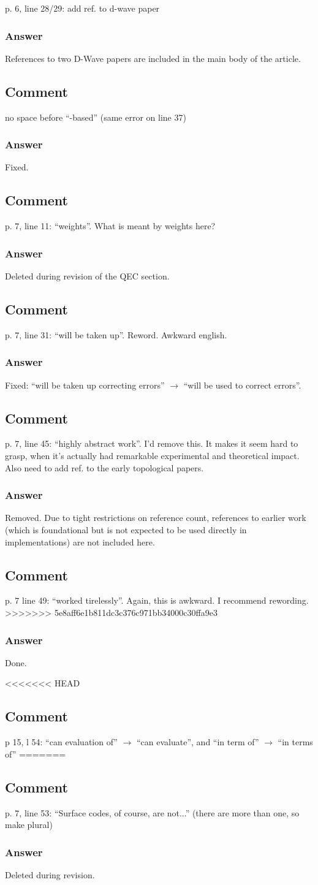 \documentclass{article}
\newcommand{\comment}{\subsection{Comment}\em}
\newcommand{\answer}{\rm \subsubsection*{Answer}}
\begin{document}
p. 6, line 28/29: add ref. to d-wave paper\\

\answer

References to two D-Wave papers are included in the main body of the
article.

\comment

no space before ``-based'' (same error on line 37)

\answer

Fixed.

\comment

p. 7, line 11: ``weights''.  What is meant by weights here?

\answer

Deleted during revision of the QEC section.

\comment

p. 7, line 31: ``will be taken up''.  Reword.  Awkward english.

\answer

Fixed: ``will be taken up correcting errors'' $\rightarrow$ ``will be
used to correct errors''.

\comment

p. 7, line 45: ``highly abstract work''.  I'd remove this.  It makes it
seem hard to grasp, when it's actually had remarkable experimental and
theoretical impact.  Also need to add ref. to the early topological
papers.

\answer

Removed.  Due to tight restrictions on reference count, references to
earlier work (which is foundational but is not expected to be used
directly in implementations) are not included here.

\comment

p. 7 line 49: ``worked tirelessly''.  Again, this is awkward.  I
recommend rewording.
>>>>>>> 5e8aff6e1b811dc3c376c971bb34000c30ffa9e3

\answer

Done.

<<<<<<< HEAD

\comment

p 15, l 54: ``can evaluation of'' $\rightarrow$ ``can evaluate'', and ``in term of'' $\rightarrow$ ``in terms of''
=======
\comment

p. 7, line 53: ``Surface codes, of course, are not...'' (there are more
than one, so make plural)

\answer

Deleted during revision.
\end{document}
